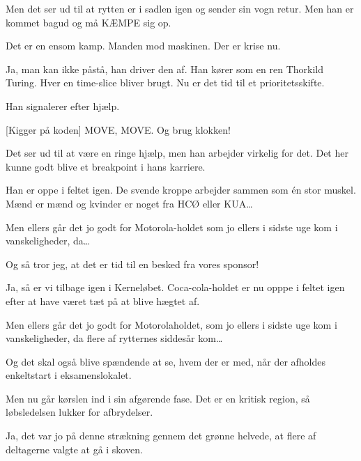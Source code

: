 \documentclass[10pt]{article}
\begin{document}
\begin{sketch}

 Men det ser ud til at rytten er i sadlen igen og sender sin vogn
retur. Men han er kommet bagud og må KÆMPE sig op.

 Det er en ensom kamp. Manden mod maskinen. Der er krise nu.

 Ja, man kan ikke påstå, han driver den af. Han kører som en ren
Thorkild Turing. Hver en time-slice bliver brugt. Nu er det tid til et
prioritetsskifte. 


 Han signalerer efter hjælp.

 [Kigger på koden] MOVE, MOVE. Og brug klokken!

 Det ser ud til at være en ringe hjælp, men han arbejder virkelig for det. Det her kunne godt blive et breakpoint i hans karriere.

 Han er oppe i feltet igen. De svende kroppe arbejder sammen som \'en
stor muskel. Mænd er mænd og kvinder er noget fra HCØ eller KUA\ldots

 Men ellers går det jo godt for Motorola-holdet som jo ellers i
sidste uge kom i vanskeligheder, da\ldots

 Og så tror jeg, at det er tid til en besked fra vores sponsor!


 Ja, så er vi tilbage igen i Kerneløbet. Coca-cola-holdet er nu opppe
i feltet igen efter at have været tæt på at blive hægtet af.

 Men ellers går det jo godt for Motorolaholdet, som jo ellers i
sidste uge kom i vanskeligheder, da flere af rytternes siddesår kom\ldots

 Og det skal også blive spændende at se, hvem der er med, når der afholdes enkeltstart i eksamenslokalet.

 Men nu går kørslen ind i sin afgørende fase. Det er en kritisk
region, så løbsledelsen lukker for afbrydelser.


 Ja, det var jo på denne strækning gennem det grønne helvede, at
flere af deltagerne valgte at gå i skoven.


\end{sketch}
\end{document}
